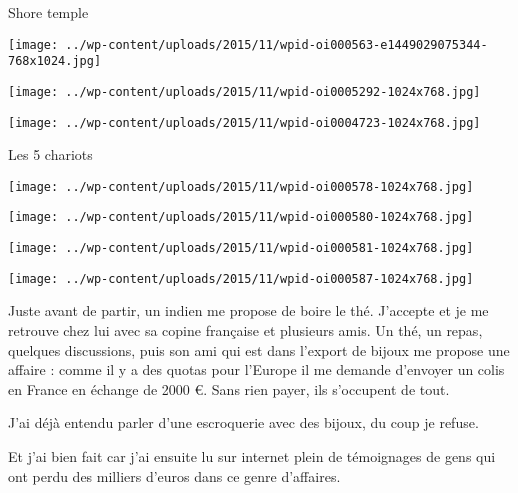  

 Shore temple 

 

\begin{center} \texttt{[image: ../wp-content/uploads/2015/11/wpid-oi000563-e1449029075344-768x1024.jpg]} \end{center}

 

 

\begin{center} \texttt{[image: ../wp-content/uploads/2015/11/wpid-oi0005292-1024x768.jpg]} \end{center}

 

 

\begin{center} \texttt{[image: ../wp-content/uploads/2015/11/wpid-oi0004723-1024x768.jpg]} \end{center}

 

 Les 5 chariots 

 

\begin{center} \texttt{[image: ../wp-content/uploads/2015/11/wpid-oi000578-1024x768.jpg]} \end{center}

 

 

\begin{center} \texttt{[image: ../wp-content/uploads/2015/11/wpid-oi000580-1024x768.jpg]} \end{center}

 

 

\begin{center} \texttt{[image: ../wp-content/uploads/2015/11/wpid-oi000581-1024x768.jpg]} \end{center}

 

 

\begin{center} \texttt{[image: ../wp-content/uploads/2015/11/wpid-oi000587-1024x768.jpg]} \end{center}

 

 Juste avant de partir, un indien me propose de boire le thé. J'accepte et je me retrouve chez lui avec sa copine française et plusieurs amis. Un thé, un repas, quelques discussions, puis son ami qui est dans l'export de bijoux me propose une affaire : comme il y a des quotas pour l'Europe il me demande d'envoyer un colis en France en échange de 2000 €. Sans rien payer, ils s'occupent de tout. 

 J'ai déjà entendu parler d'une escroquerie avec des bijoux, du coup je refuse. 

 Et j'ai bien fait car j'ai ensuite lu sur internet plein de témoignages de gens qui ont perdu des milliers d'euros dans ce genre d'affaires.


 
 
